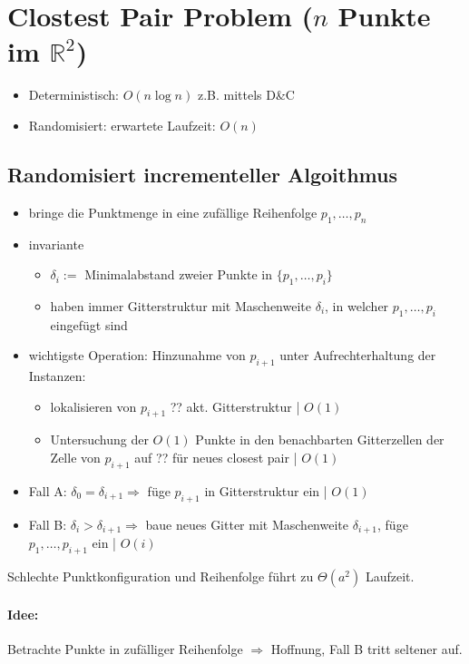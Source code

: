 \section{Clostest Pair Problem ($n$ Punkte im $\mathbb{R}^2$)}
\begin{itemize}
	\item Deterministisch: $O(n \log n)$ z.B. mittels D\&C
	\item Randomisiert: erwartete Laufzeit: $O(n)$
\end{itemize}
\subsection{Randomisiert incrementeller Algoithmus}
\begin{itemize}
	\item bringe die Punktmenge in eine zufällige Reihenfolge $p_1,\dots,p_n$
	\item invariante
	\begin{itemize}
		\item $\delta_i :=$ Minimalabstand zweier Punkte in $\{ p_1,\dots,p_i \}$
		\item haben immer Gitterstruktur mit Maschenweite $\delta_i$, in welcher $p_1,\dots,p_i$ eingefügt sind
	\end{itemize}
	\item wichtigste Operation: Hinzunahme von $p_{i+1}$ unter Aufrechterhaltung der Instanzen:
	\begin{itemize}
		\item lokalisieren von $p_{i+1}$ ?? akt. Gitterstruktur | $O(1)$ %
		\item Untersuchung der $O(1)$ Punkte in den benachbarten Gitterzellen der Zelle von $p_{i+1}$ auf ?? für neues closest pair | $O(1)$ %
	\end{itemize}
	\item[] Fall A: $\delta_0 = \delta_{i+1} \Rightarrow$ füge $p_{i+1}$ in Gitterstruktur ein | $O(1)$
	\item[] Fall B: $\delta_i > \delta_{i+1} \Rightarrow$ baue neues Gitter mit Maschenweite $\delta_{i+1}$, füge $p_1,\dots,p_{i+1}$ ein | $O(i)$
\end{itemize}

Schlechte Punktkonfiguration und Reihenfolge führt zu $\Theta(a^2)$ Laufzeit.

\paragraph*{Idee:} Betrachte Punkte in zufälliger Reihenfolge $\Rightarrow$ Hoffnung, Fall B tritt seltener auf.

